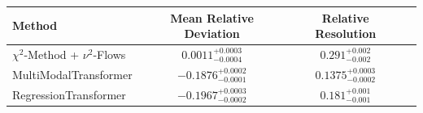     \begin{tabular}{lccc}
        \toprule
        Method & Mean Relative Deviation & Relative Resolution \\
        \midrule
        $\chi^2$-Method + $\nu^2$-Flows & $0.0011_{-0.0004}^{+0.0003}$ & $0.291_{-0.002}^{+0.002}$ \\
        MultiModalTransformer & $-0.1876_{-0.0001}^{+0.0002}$ & $0.1375_{-0.0002}^{+0.0003}$ \\
        RegressionTransformer & $-0.1967_{-0.0002}^{+0.0003}$ & $0.181_{-0.001}^{+0.001}$ \\
        \bottomrule
    \end{tabular}